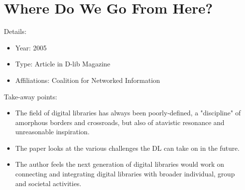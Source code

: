 \documentclass[12pt, onecolumn]{IEEEtran}
\begin{document}
\section{Where Do We Go From Here? \cite{lynch:2005:dl}}
\noindent Details:
\begin{itemize}
  \item Year: 2005
  \item Type: Article in D-lib Magazine
  \item Affiliations: Coalition for Networked Information
\end{itemize}
\medskip
Take-away points:
\begin{itemize}
  \item The field of digital libraries has always been poorly-defined, a "discipline" of amorphous borders and crossroads, but also of atavistic resonance and unreasonable inspiration.
  \item The paper looks at the various challenges the DL can take on in the future.
  \item The author feels the next generation of digital libraries would work on connecting and integrating digital libraries with broader individual, group and societal activities.
\end{itemize}
\bigskip\bigskip




\end{document}
